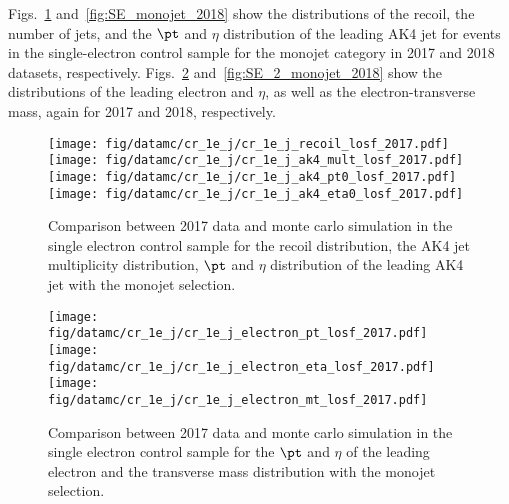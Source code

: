 Figs.~\ref{fig:SE_monojet_2017} and~\ref{fig:SE_monojet_2018} show the distributions of the recoil, the number of jets, and the $\pt$ and $\eta$ distribution of the leading AK4  jet
for events in the single-electron control sample for the monojet category in 2017 and 2018 datasets, respectively. Figs.~\ref{fig:SE_2_monojet_2017} and~\ref{fig:SE_2_monojet_2018} show the distributions of the leading electron \pt and $\eta$, as well as the electron-\ptmiss transverse mass, again for 2017 and 2018, respectively.

\begin{figure}[htbp]
    \begin{center}
        \texttt{[image: fig/datamc/cr\_1e\_j/cr\_1e\_j\_recoil\_losf\_2017.pdf]}
        \texttt{[image: fig/datamc/cr\_1e\_j/cr\_1e\_j\_ak4\_mult\_losf\_2017.pdf]} \\
        \texttt{[image: fig/datamc/cr\_1e\_j/cr\_1e\_j\_ak4\_pt0\_losf\_2017.pdf]}
        \texttt{[image: fig/datamc/cr\_1e\_j/cr\_1e\_j\_ak4\_eta0\_losf\_2017.pdf]}
    \end{center}
    \caption{Comparison between 2017 data and monte carlo simulation in the single electron control sample for
        the recoil distribution, the AK4 jet multiplicity distribution,  $\pt$ and $\eta$ distribution
        of the leading AK4  jet with the monojet selection.}
    \label{fig:SE_monojet_2017}
\end{figure}

\begin{figure}[htbp]
    \begin{center}
        \texttt{[image: fig/datamc/cr\_1e\_j/cr\_1e\_j\_electron\_pt\_losf\_2017.pdf]}
        \texttt{[image: fig/datamc/cr\_1e\_j/cr\_1e\_j\_electron\_eta\_losf\_2017.pdf]} \\
        \texttt{[image: fig/datamc/cr\_1e\_j/cr\_1e\_j\_electron\_mt\_losf\_2017.pdf]}
    \end{center}
    \caption{Comparison between 2017 data and monte carlo simulation in the single electron control sample for
        the $\pt$ and $\eta$ of the leading electron and the transverse mass distribution with the monojet selection.}
    \label{fig:SE_2_monojet_2017}
\end{figure}

